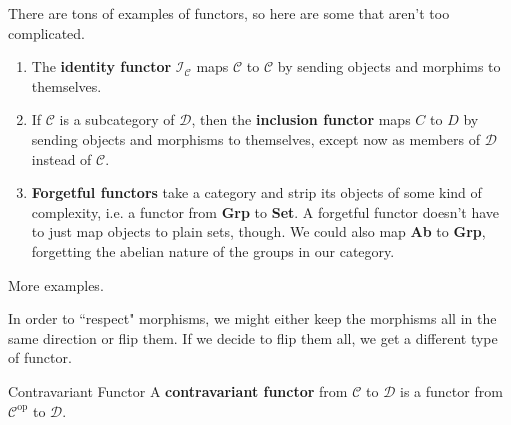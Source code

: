 \documentclass[10pt]{report}
\DeclareMathOperator{\op}{op}
\begin{document}
There are tons of examples of functors, so here are some that aren't too complicated.
\begin{enumerate}
	\item The \textbf{identity functor} $\mathcal{I}_{\mathscr{C}}$ maps $\mathscr{C}$ to $\mathscr{C}$ by sending objects and morphims to themselves.
	\item If $\mathscr{C}$ is a subcategory of $\mathscr{D}$, then the \textbf{inclusion functor} maps $C$ to $D$ by sending objects and morphisms to themselves, except now as members of $\mathscr{D}$ instead of $\mathscr{C}$.
	\item \textbf{Forgetful functors} take a category and strip its objects of some kind of complexity, i.e. a functor from \textbf{Grp} to \textbf{Set}. A forgetful functor doesn't have to just map objects to plain sets, though. We could also map \textbf{Ab} to \textbf{Grp}, forgetting the abelian nature of the groups in our category.
\end{enumerate}

{\color{red}More examples.}

In order to ``respect" morphisms, we might either keep the morphisms all in the same direction or flip them. If we decide to flip them all, we get a different type of functor.

\begin{defn}{Contravariant Functor}{}
	A \textbf{contravariant functor} from $\mathscr{C}$ to $\mathscr{D}$ is a functor from $\mathscr{C}^{\op}$ to $\mathscr{D}$.
\end{defn}
\end{document}
